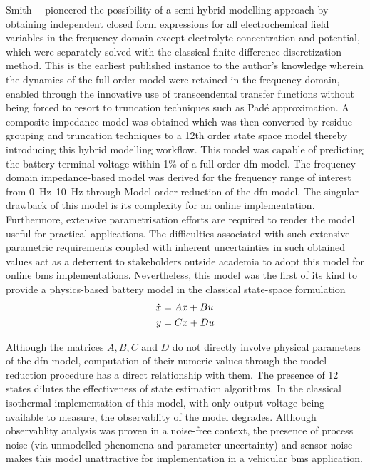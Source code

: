 Smith~\etal{}~\cite{Smith2007} pioneered the possibility of a semi-hybrid modelling approach by obtaining independent
closed form expressions for all electrochemical field variables in the frequency domain except electrolyte concentration
and potential, which were separately solved with the classical finite difference discretization method.  This is the
earliest published instance to the author's knowledge wherein the dynamics of the full order model were retained in the
frequency domain, enabled through the innovative use of transcendental transfer functions without being forced to resort
to truncation techniques such as Padé approximation. A composite impedance model was obtained which was then converted
by residue grouping and truncation techniques to a 12th order state space model thereby introducing this hybrid
modelling workflow. This model was capable of predicting the battery terminal voltage within 1\% of a full-order
\gls{dfn} model. The frequency domain impedance-based model was derived for the frequency range of interest from
\SIrange{0}{10}{\hertz} through Model order reduction of the \gls{dfn} model. The singular drawback of this model is its
complexity for an online implementation. Furthermore, extensive parametrisation efforts are required  to render the model useful for practical applications. The
difficulties associated with such extensive parametric requirements coupled with inherent uncertainties in such obtained
values act as a deterrent to stakeholders outside academia to adopt this model for online \gls{bms} implementations.
Nevertheless, this model was the first of its kind to provide a physics-based battery model in the classical state-space
formulation
\begin{align}
    \dot{x} &= Ax + Bu \\\notag
    y &= Cx + Du
\end{align}

Although
the matrices $A, B, C$ and $D$ do not directly involve physical parameters of the \gls{dfn} model, computation of their
numeric values through the model reduction procedure has a direct relationship with them. The presence of 12 states
dilutes the effectiveness of state estimation algorithms. In the classical isothermal implementation of this model, with
only output voltage being available to measure, the observablity of the model degrades. Although observablity analysis
was proven in a noise-free context, the presence of process noise (via unmodelled phenomena and parameter uncertainty)
and sensor noise makes this model unattractive for implementation in a vehicular \gls{bms} application.

